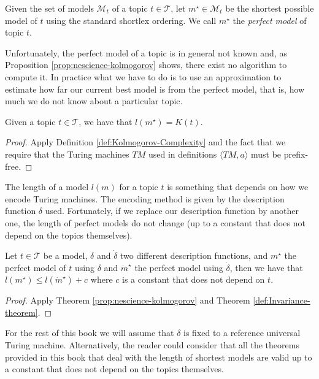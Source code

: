 \begin{definition}
\label{def:descriptions_perfect_model}
Given the set of models $\mathcal{M}_t$ of a topic $t \in \mathcal{T}$, let $m^{\star} \in \mathcal{M}_t$ be the shortest possible model of $t$ using the standard shortlex ordering. We call $m^{\star}$ the \emph{perfect model} of topic $t$.
\end{definition}

Unfortunately, the perfect model of a topic is in general not known and, as Proposition \ref{prop:nescience-kolmogorov} shows, there exist no algorithm to compute it. In practice what we have to do is to use an approximation to estimate how far our current best model is from the perfect model, that is, how much we do not know about a particular topic.

\begin{proposition}
\label{prop:nescience-kolmogorov}
Given a topic $t \in \mathcal{T}$, we have that $l \left(m^{\star} \right) = K\left( t \right)$.
\end{proposition}
\begin{proof}
Apply Definition \ref{def:Kolmogorov-Complexity} and the fact that we require that the Turing machines $TM$ used in definitions $\langle TM,a\rangle$ must be prefix-free.
\end{proof}

The length of a model $l \left( m \right)$ for a topic $t$ is something that depends on how we encode Turing machines. The encoding method is given by the description function $\delta$ used. Fortunately, if we replace our description function by another one, the length of perfect models do not change (up to a constant that does not depend on the topics themselves).

\begin{corollary}
Let $t \in \mathcal{T}$ be a model, $\delta$ and $\dot{\delta}$ two different description functions, and $m^{\star}$ the perfect model of $t$ using $\delta$ and $\dot{m}^{\star}$ the perfect model using $\dot{\delta}$, then we have that $l \left( m^{\star} \right) \leq l \left( \dot{m}^{\star} \right) + c$ where $c$ is a constant that does not depend on $t$.
\end{corollary}
\begin{proof}
Apply Theorem \ref{prop:nescience-kolmogorov} and Theorem \ref{def:Invariance-theorem}.
\end{proof}

For the rest of this book we will assume that $\delta$ is fixed to a reference universal Turing machine. Alternatively, the reader could consider that all the theorems provided in this book that deal with the length of shortest models are valid up to a constant that does not depend on the topics themselves.

